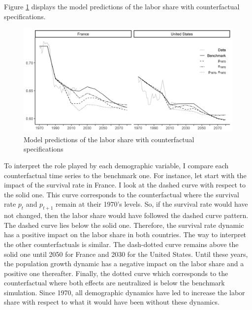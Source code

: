 Figure \ref{fig:counter_PGSR} displays the model predictions of the labor share with counterfactual specifications.
\begin{figure}[tb]
	\centering
	\includegraphics[width=1\linewidth]{../result/decomposition/counter_PGSR.png}
	\caption{Model predictions of the labor share with counterfactual specifications}\label{fig:counter_PGSR}
\end{figure}
To interpret the role played by each demographic variable, I compare each counterfactual time series to the benchmark one. For instance, let start with the impact of the survival rate in France. I look at the dashed curve with respect to the solid one. This curve corresponds to the counterfactual where the survival rate $p_t$ and $p_{t+1}$ remain at their 1970's levels. So, if the survival rate would have not changed, then the labor share would have followed the dashed curve pattern. 
The dashed curve lies below the solid one. Therefore, the survival rate dynamic has a positive impact on the labor share in both countries.
The way to interpret the other counterfactuals is similar.
The dash-dotted curve remains above the solid one until 2050 for France and 2030 for the United States. Until these years, the population growth dynamic has a negative impact on the labor share and a positive one thereafter.
Finally, the dotted curve which corresponds to the counterfactual where both effects are neutralized is below the benchmark simulation. Since 1970, all demographic dynamics have led to increase the labor share with respect to what it would have been without these dynamics.
